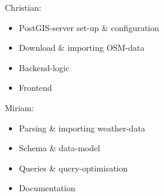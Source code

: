 \documentclass[paper=a4, fontsize=11pt]{article} %
\numberwithin{equation}{section} %
\numberwithin{figure}{section} %
\numberwithin{table}{section} %
\begin{document}
Christian:
	\begin{itemize}
    	\item PostGIS-server set-up \& configuration
    	\item Download \& importing OSM-data
   		\item Backend-logic
    	\item Frontend
    \end{itemize}
    
Miriam:
	\begin{itemize}
    	\item Parsing \& importing weather-data
    	\item Schema \& data-model
    	\item Queries \& query-optimisation
    	\item Documentation
    \end{itemize}

\newpage
\end{document}
